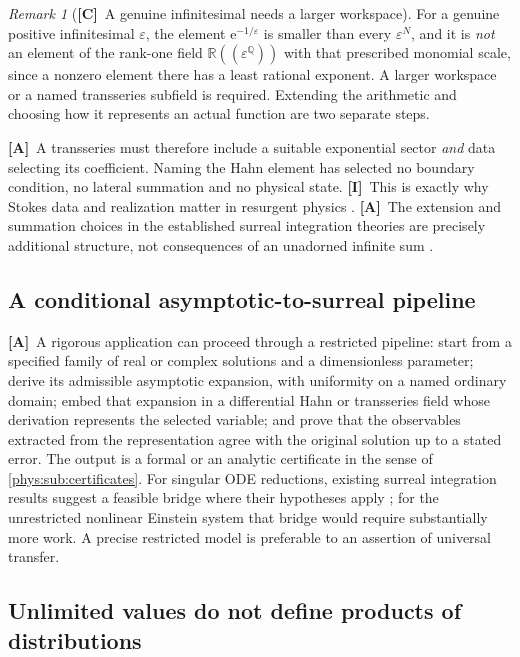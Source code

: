 \documentclass[11pt,letterpaper]{article}
\numberwithin{equation}{section}
\theoremstyle{definition}
\theoremstyle{remark}
\newtheorem{remark}[theorem]{Remark}
\newcommand{\R}{\mathbb R}
\newcommand{\Q}{\mathbb Q}
\newcommand{\eps}{\varepsilon}
\newcommand{\ee}{\mathrm e}
\newcommand{\TC}{\textcolor{TierC}{\textsf{\bfseries[C]}}}
\newcommand{\TA}{\textcolor{TierA}{\textsf{\bfseries[A]}}}
\newcommand{\TI}{\textcolor{TierI}{\textsf{\bfseries[I]}}}
\begin{document}
\begin{remark}[\TC\ A genuine infinitesimal needs a larger workspace]
\label{phys:rem:notinrank1}
For a genuine positive infinitesimal $\eps$, the element $\ee^{-1/\eps}$ is
smaller than every $\eps^{N}$, and it is \emph{not} an element of the rank-one
field $\R((\eps^{\Q}))$ with that prescribed monomial scale, since a nonzero
element there has a least rational exponent. A larger workspace or a named
transseries subfield is required. Extending the arithmetic and choosing how it
represents an actual function are two separate steps.
\end{remark}

\TA\ A transseries must therefore include a suitable exponential sector
\emph{and} data selecting its coefficient. Naming the Hahn element has selected
no boundary condition, no lateral summation and no physical state. \TI\ This is
exactly why Stokes data and realization matter in resurgent physics
\cite{phys:Resurgence}. \TA\ The extension and summation choices in the
established surreal integration theories are precisely additional structure,
not consequences of an unadorned infinite sum \cite{phys:CE,phys:BMgerms}.

\subsection{A conditional asymptotic-to-surreal pipeline}
\label{phys:sub:pipeline}

\TA\ A rigorous application can proceed through a restricted pipeline: start
from a specified family of real or complex solutions and a dimensionless
parameter; derive its admissible asymptotic expansion, with uniformity on a
named ordinary domain; embed that expansion in a differential Hahn or
transseries field whose derivation represents the selected variable; and prove
that the observables extracted from the representation agree with the original
solution up to a stated error. The output is a formal or an analytic
certificate in the sense of \cref{phys:sub:certificates}. For singular ODE
reductions, existing surreal integration results suggest a feasible bridge
where their hypotheses apply \cite{phys:CE}; for the unrestricted nonlinear
Einstein system that bridge would require substantially more work. A precise
restricted model is preferable to an assertion of universal transfer.

\subsection{Unlimited values do not define products of distributions}
\label{phys:sub:distributions}
\end{document}
